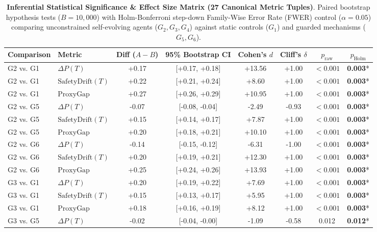 \begin{table}[t]
\centering
\small
\caption{\textbf{Inferential Statistical Significance & Effect Size Matrix (27 Canonical Metric Tuples)}. Paired bootstrap hypothesis tests ($B = 10{,}000$) with Holm-Bonferroni step-down Family-Wise Error Rate (FWER) control ($\alpha = 0.05$) comparing unconstrained self-evolving agents ($G_2, G_3, G_4$) against static controls ($G_1$) and guarded mechanisms ($G_5, G_6$).}
\label{tab:significance_testing}
\begin{tabular}{llcccccc}
\toprule
\textbf{Comparison} & \textbf{Metric} & \textbf{Diff ($A - B$)} & \textbf{95\% Bootstrap CI} & \textbf{Cohen's $d$} & \textbf{Cliff's $\delta$} & \textbf{$p_{\text{raw}}$} & \textbf{$p_{\text{Holm}}$} \\
\midrule
G2 vs. G1 & $\Delta P(T)$ & +0.17 & [+0.17, +0.18] & +13.56 & +1.00 & $<0.001$ & \textbf{0.003}* \\
G2 vs. G1 & $\text{SafetyDrift}(T)$ & +0.22 & [+0.21, +0.24] & +8.60 & +1.00 & $<0.001$ & \textbf{0.003}* \\
G2 vs. G1 & $\text{ProxyGap}$ & +0.27 & [+0.26, +0.29] & +10.95 & +1.00 & $<0.001$ & \textbf{0.003}* \\
G2 vs. G5 & $\Delta P(T)$ & -0.07 & [-0.08, -0.04] & -2.49 & -0.93 & $<0.001$ & \textbf{0.003}* \\
G2 vs. G5 & $\text{SafetyDrift}(T)$ & +0.15 & [+0.14, +0.17] & +7.87 & +1.00 & $<0.001$ & \textbf{0.003}* \\
G2 vs. G5 & $\text{ProxyGap}$ & +0.20 & [+0.18, +0.21] & +10.10 & +1.00 & $<0.001$ & \textbf{0.003}* \\
G2 vs. G6 & $\Delta P(T)$ & -0.14 & [-0.15, -0.12] & -6.31 & -1.00 & $<0.001$ & \textbf{0.003}* \\
G2 vs. G6 & $\text{SafetyDrift}(T)$ & +0.20 & [+0.19, +0.21] & +12.30 & +1.00 & $<0.001$ & \textbf{0.003}* \\
G2 vs. G6 & $\text{ProxyGap}$ & +0.25 & [+0.24, +0.26] & +13.93 & +1.00 & $<0.001$ & \textbf{0.003}* \\
G3 vs. G1 & $\Delta P(T)$ & +0.20 & [+0.19, +0.22] & +7.69 & +1.00 & $<0.001$ & \textbf{0.003}* \\
G3 vs. G1 & $\text{SafetyDrift}(T)$ & +0.15 & [+0.13, +0.17] & +5.95 & +1.00 & $<0.001$ & \textbf{0.003}* \\
G3 vs. G1 & $\text{ProxyGap}$ & +0.18 & [+0.16, +0.19] & +8.12 & +1.00 & $<0.001$ & \textbf{0.003}* \\
G3 vs. G5 & $\Delta P(T)$ & -0.02 & [-0.04, -0.00] & -1.09 & -0.58 & 0.012 & \textbf{0.012}* \\

\end{tabular}
\end{table}
